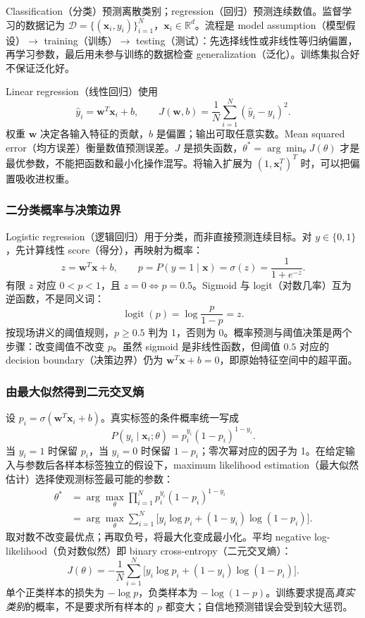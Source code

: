 Classification（分类）预测离散类别；regression（回归）预测连续数值。监督学习的数据记为 $\mathcal D=\{(\mathbf x_i,y_i)\}_{i=1}^N$，$\mathbf x_i\in\mathbb R^d$。流程是 model assumption（模型假设）$\rightarrow$ training（训练）$\rightarrow$ testing（测试）：先选择线性或非线性等归纳偏置，再学习参数，最后用未参与训练的数据检查 generalization（泛化）。训练集拟合好不保证泛化好。

Linear regression（线性回归）使用
\[
  \hat y_i=\mathbf w^T\mathbf x_i+b,
  \qquad
  J(\mathbf w,b)=\frac1N\sum_{i=1}^N(\hat y_i-y_i)^2.
\]
权重 $\mathbf w$ 决定各输入特征的贡献，$b$ 是偏置；输出可取任意实数。Mean squared error（均方误差）衡量数值预测误差。$J$ 是损失函数，$\theta^*=\arg\min_\theta J(\theta)$ 才是最优参数，不能把函数和最小化操作混写。将输入扩展为 $(1,\mathbf x_i^T)^T$ 时，可以把偏置吸收进权重。


\subsubsection{二分类概率与决策边界}

Logistic regression（逻辑回归）用于分类，而非直接预测连续目标。对 $y\in\{0,1\}$，先计算线性 score（得分），再映射为概率：
\[
  z=\mathbf w^T\mathbf x+b,
  \qquad
  p=P(y=1\mid\mathbf x)=\sigma(z)=\frac1{1+e^{-z}}.
\]
有限 $z$ 对应 $0<p<1$，且 $z=0\Leftrightarrow p=0.5$。Sigmoid 与 logit（对数几率）互为逆函数，不是同义词：
\[
  \operatorname{logit}(p)=\log\frac{p}{1-p}=z.
\]
按现场讲义的阈值规则，$p\ge0.5$ 判为 1，否则为 0。概率预测与阈值决策是两个步骤：改变阈值不改变 $p$。虽然 sigmoid 是非线性函数，但阈值 $0.5$ 对应的 decision boundary（决策边界）仍为 $\mathbf w^T\mathbf x+b=0$，即原始特征空间中的超平面。

\subsubsection{由最大似然得到二元交叉熵}

设 $p_i=\sigma(\mathbf w^T\mathbf x_i+b)$。真实标签的条件概率统一写成
\[
  P(y_i\mid\mathbf x_i;\theta)=p_i^{y_i}(1-p_i)^{1-y_i}.
\]
当 $y_i=1$ 时保留 $p_i$，当 $y_i=0$ 时保留 $1-p_i$；零次幂对应的因子为 1。在给定输入与参数后各样本标签独立的假设下，maximum likelihood estimation（最大似然估计）选择使观测标签最可能的参数：
\begin{align*}
  \theta^*
  &=\arg\max_\theta\prod_{i=1}^N p_i^{y_i}(1-p_i)^{1-y_i}\\
  &=\arg\max_\theta\sum_{i=1}^N
       \bigl[y_i\log p_i+(1-y_i)\log(1-p_i)\bigr].
\end{align*}
取对数不改变最优点；再取负号，将最大化变成最小化。平均 negative log-likelihood（负对数似然）即 binary cross-entropy（二元交叉熵）：
\[
  \boxed{J(\theta)=-\frac1N\sum_{i=1}^N
    \bigl[y_i\log p_i+(1-y_i)\log(1-p_i)\bigr].}
\]
单个正类样本的损失为 $-\log p$，负类样本为 $-\log(1-p)$。训练要求提高\emph{真实类别}的概率，不是要求所有样本的 $p$ 都变大；自信地预测错误会受到较大惩罚。

